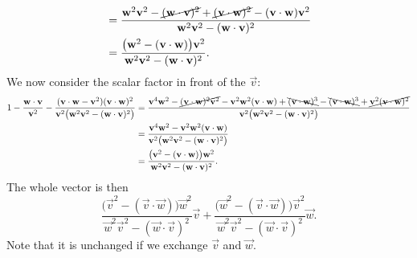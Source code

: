 \begin{note}
\begin{align*}
&= \frac{\vec{w}^2 \vec{v}^2 - \cancel{(\vec{w}\cdot \vec{v})^2} + \cancel{(\vec{v}\cdot \vec{w})^2} - (\vec{v}\cdot \vec{w})\vec{v}^2}{\vec{w}^2 \vec{v}^2 - (\vec{w}\cdot \vec{v})^2} \\
&= \frac{\big(\vec{w}^2 - (\vec{v}\cdot \vec{w})\big)\vec{v}^2}{\vec{w}^2 \vec{v}^2 - (\vec{w}\cdot \vec{v})^2}.
\end{align*}
We now consider the scalar factor in front of the $\vec{v}$:
\begin{align*}
1 - \frac{\vec{w}\cdot \vec{v}}{\vec{v}^2} - \frac{(\vec{v}\cdot \vec{w} - \vec{v}^2)(\vec{v}\cdot \vec{w})^2}{\vec{v}^2\big(\vec{w}^2 \vec{v}^2 - (\vec{w}\cdot \vec{v})^2\big)} &= \frac{\vec{v}^4 \vec{w}^2 - \cancel{(\vec{v}\cdot \vec{w})^2 \vec{v}^2} - \vec{v}^2 \vec{w}^2 (\vec{v}\cdot \vec{w}) + \bcancel{(\vec{v}\cdot \vec{w})^3} - \bcancel{(\vec{v}\cdot \vec{w})^3} + \cancel{\vec{v}^2(\vec{v}\cdot \vec{w})^2}}{\vec{v}^2\big(\vec{w}^2 \vec{v}^2 - (\vec{w}\cdot \vec{v})^2\big)} \\
&= \frac{\vec{v}^4 \vec{w}^2 - \vec{v}^2 \vec{w}^2 (\vec{v}\cdot \vec{w})}{\vec{v}^2\big(\vec{w}^2 \vec{v}^2 - (\vec{w}\cdot \vec{v})^2\big)} \\
&= \frac{\big(\vec{v}^2 - (\vec{v}\cdot \vec{w})\big)\vec{w}^2}{\vec{w}^2 \vec{v}^2 - (\vec{w}\cdot \vec{v})^2}.
\end{align*}
The whole vector is then
\[ \frac{\big(\vec{v}^2 - (\vec{v}\cdot \vec{w})\big)\vec{w}^2}{\vec{w}^2 \vec{v}^2 - (\vec{w}\cdot \vec{v})^2}\vec{v} + \frac{\big(\vec{w}^2 - (\vec{v}\cdot \vec{w})\big)\vec{v}^2}{\vec{w}^2 \vec{v}^2 - (\vec{w}\cdot \vec{v})^2}\vec{w}. \]
Note that it is unchanged if we exchange $\vec{v}$ and $\vec{w}$.
\end{note}

